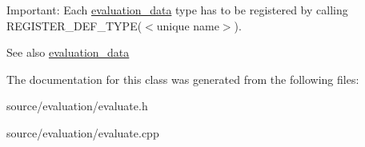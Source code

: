 Important\+: Each \hyperlink{classevaluation__data}{evaluation\+\_\+data} type has to be registered by calling R\+E\+G\+I\+S\+T\+E\+R\+\_\+\+D\+E\+F\+\_\+\+T\+Y\+P\+E($<$unique name$>$). \begin{DoxySeeAlso}{See also}
\hyperlink{classevaluation__data}{evaluation\+\_\+data} 
\end{DoxySeeAlso}


The documentation for this class was generated from the following files\+:\begin{DoxyCompactItemize}
\item 
source/evaluation/evaluate.\+h\item 
source/evaluation/evaluate.\+cpp\end{DoxyCompactItemize}
